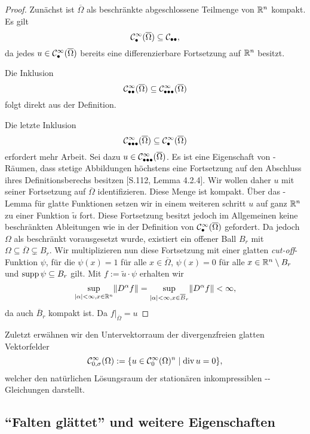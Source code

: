 \begin{proof}
  Zunächst ist $\overline\Omega$ als beschränkte abgeschlossene Teilmenge von $\mathbb{R}^n$ kompakt.
  Es gilt $$\mathcal{C}^\infty_\bullet(\overline\Omega) \subseteq \mathcal{C}_{\bullet\bullet},$$ da jedes $u\in \mathcal{C}^\infty_\bullet(\overline\Omega)$ bereits eine differenzierbare Fortsetzung auf $\mathbb{R}^n$ besitzt.

  Die Inklusion $$\mathcal{C}^\infty_{\bullet\bullet}(\overline\Omega) \subseteq \mathcal{C}^\infty_{\bullet\bullet\bullet}(\overline\Omega)$$ folgt direkt aus der Definition.
  
  Die letzte Inklusion $$\mathcal{C}^\infty_{\bullet\bullet\bullet}(\overline\Omega) \subseteq \mathcal{C}^\infty_{\bullet}(\overline\Omega)$$ erfordert mehr Arbeit.
  Sei dazu $u \in \mathcal{C}^\infty_{\bullet\bullet\bullet}(\overline\Omega)$.
  Es ist eine Eigenschaft von \hausdorff\hyp{}Räumen, dass stetige Abbildungen höchstens eine Fortsetzung auf den Abschluss ihres Definitionsberechs besitzen \cite{bartsch2015topologie}[S.112, Lemma 4.2.4].
  Wir wollen daher $u$ mit seiner Fortsetzung auf $\overline\Omega$ identifizieren.
  Diese Menge ist kompakt.
  Über das \urysohn\hyp{}Lemma für glatte Funktionen \cite{rochskriptehernicht} setzen wir in einem weiteren schritt $u$ auf ganz $\mathbb{R}^n$ zu einer Funktion $\tilde u$ fort.
  Diese Fortsetzung besitzt jedoch im Allgemeinen keine beschränkten Ableitungen wie in der Definition von $\mathcal{C}^\infty_{\bullet}(\overline\Omega)$ gefordert.
  Da jedoch $\Omega$ als beschränkt vorausgesetzt wurde, existiert ein offener Ball $B_r$ mit $\Omega \subseteq \overline\Omega \subsetneq B_r$. 
  Wir multiplizieren nun diese Fortsetzung mit einer glatten \emph{cut-off}\hyp{}Funktion $\psi$, für die
  $\psi(x) = 1$ für alle $x \in \overline\Omega$, $\psi(x) = 0$ für alle $x \in \mathbb{R}^n \setminus B_r$ und $\operatorname{supp} \psi \subseteq B_r$ gilt.
  Mit $f := \tilde u \cdot \psi$ erhalten wir
  $$
  \sup_{|\alpha| < \infty, x \in \mathbb{R}^n}\lVert  D^\alpha f \rVert
   = \sup_{|\alpha| < \infty, x \in \overline B_r}\lVert  D^\alpha f \rVert
   < \infty,
  $$
  da auch $\overline B_r$ kompakt ist.
  Da $f|_{\overline\Omega} = u$
\end{proof}

Zuletzt erwähnen wir den Untervektorraum der divergenzfreien glatten Vektorfelder
$$
\mathcal{C}_{0,\sigma}^\infty(\Omega) := \{u \in \mathcal{C}_0^\infty(\Omega)^n \mid \mathrm{div\,} u = 0\},
$$
 welcher den natürlichen Lösungsraum der stationären inkompressiblen \navier\hyp{}\stokes\hyp{}Gleichungen darstellt.

\subsection{``Falten glättet'' und weitere Eigenschaften}
\label{subsec:mollification}

